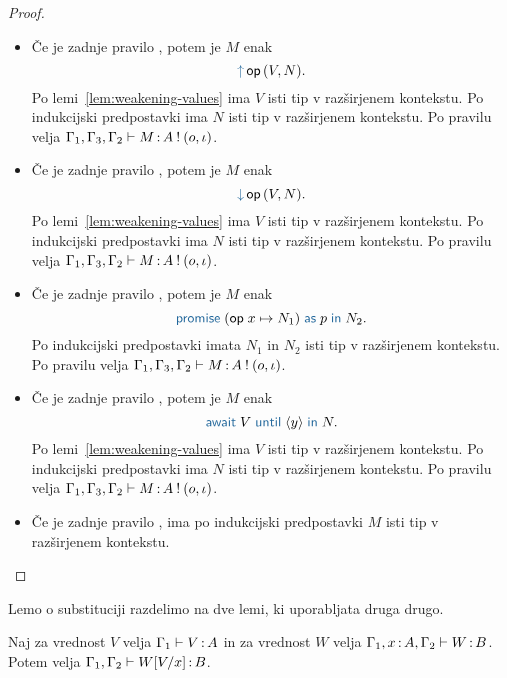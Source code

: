 \begin{proof}
\begin{itemize}
		\item Če je zadnje pravilo , potem je $M$ enak $$\tmopout{op}{V}{N}.$$
		Po lemi~\ref{lem:weakening-values} ima $V$ isti tip v razširjenem kontekstu.
		Po indukcijski predpostavki ima $N$ isti tip v razširjenem kontekstu.
		Po pravilu  velja $\Gamma_1, \Gamma_3, \Gamma_2 \vdash M \mathinner{:} A \mathbin{!} (o, \iota)$.
		
		\item Če je zadnje pravilo , potem je $M$ enak $$\tmopin{op}{V}{N}.$$
		Po lemi~\ref{lem:weakening-values} ima $V$ isti tip v razširjenem kontekstu.
		Po indukcijski predpostavki ima $N$ isti tip v razširjenem kontekstu.
		Po pravilu  velja $\Gamma_1, \Gamma_3, \Gamma_2 \vdash M \mathinner{:} A \mathbin{!} (o, \iota)$.
		
		\item Če je zadnje pravilo , potem je $M$ enak $$\tmwith{op}{x}{N_1}{p}{N_2}.$$
		Po indukcijski predpostavki imata $N_1$ in $N_2$ isti tip v razširjenem kontekstu.
		Po pravilu  velja $\Gamma_1, \Gamma_3, \Gamma_2 \vdash M \mathinner{:} A \mathbin{!} (o, \iota)$.
		
		\item Če je zadnje pravilo , potem je $M$ enak $$\tmawait{V}{y}{N}.$$
		Po lemi~\ref{lem:weakening-values} ima $V$ isti tip v razširjenem kontekstu.
		Po indukcijski predpostavki ima $N$ isti tip v razširjenem kontekstu.
		Po pravilu  velja $\Gamma_1, \Gamma_3, \Gamma_2 \vdash M \mathinner{:} A \mathbin{!} (o, \iota)$.
		
		\item Če je zadnje pravilo , ima po indukcijski predpostavki $M$ isti tip v razširjenem kontekstu.
		
	\end{itemize}
\end{proof}

Lemo o substituciji razdelimo na dve lemi, ki uporabljata druga drugo.

\begin{lema}\label{lem:substitucija-vrednosti}
	Naj za vrednost $V$ velja $\Gamma_1 \vdash V \mathinner{:} A$ in za vrednost $W$ velja $\Gamma_1, x \mathinner{:} A, \Gamma_2 \vdash W \mathinner{:} B$. Potem velja $\Gamma_1, \Gamma_2 \vdash W[V/x] \mathinner{:} B$.
\end{lema}

